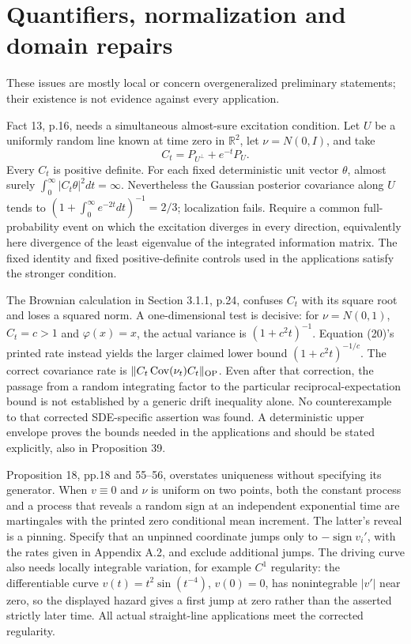 \documentclass[10pt]{article}
\begin{document}
\section*{Quantifiers, normalization and domain repairs}
These issues are mostly local or concern overgeneralized preliminary statements; their existence is not evidence against every application.\par
Fact 13, p.16, needs a simultaneous almost-sure excitation condition. Let \(U\) be a uniformly random line known at time zero in \(\mathbb R^2\), let \(\nu=N(0,I)\), and take \[C_t=P_{U^\perp}+e^{-t}P_U.\] Every \(C_t\) is positive definite. For each fixed deterministic unit vector \(\theta\), almost surely \(\int_0^\infty|C_t\theta|^2dt=\infty\). Nevertheless the Gaussian posterior covariance along \(U\) tends to \((1+\int_0^\infty e^{-2t}dt)^{-1}=2/3\); localization fails. Require a common full-probability event on which the excitation diverges in every direction, equivalently here divergence of the least eigenvalue of the integrated information matrix. The fixed identity and fixed positive-definite controls used in the applications satisfy the stronger condition.\par
The Brownian calculation in Section 3.1.1, p.24, confuses \(C_t\) with its square root and loses a squared norm. A one-dimensional test is decisive: for \(\nu=N(0,1)\), \(C_t=c>1\) and \(\varphi(x)=x\), the actual variance is \((1+c^2t)^{-1}\). Equation (20)’s printed rate instead yields the larger claimed lower bound \((1+c^2t)^{-1/c}\). The correct covariance rate is \(\|C_t\operatorname{Cov}(\nu_t)C_t\|_{\rm OP}\). Even after that correction, the passage from a random integrating factor to the particular reciprocal-expectation bound is not established by a generic drift inequality alone. No counterexample to that corrected SDE-specific assertion was found. A deterministic upper envelope proves the bounds needed in the applications and should be stated explicitly, also in Proposition 39.\par
Proposition 18, pp.18 and 55–56, overstates uniqueness without specifying its generator. When \(v\equiv0\) and \(\nu\) is uniform on two points, both the constant process and a process that reveals a random sign at an independent exponential time are martingales with the printed zero conditional mean increment. The latter’s reveal is a pinning. Specify that an unpinned coordinate jumps only to \(-\operatorname{sign}v_i'\), with the rates given in Appendix A.2, and exclude additional jumps. The driving curve also needs locally integrable variation, for example \(C^1\) regularity: the differentiable curve \(v(t)=t^2\sin(t^{-4})\), \(v(0)=0\), has nonintegrable \(|v'|\) near zero, so the displayed hazard gives a first jump at zero rather than the asserted strictly later time. All actual straight-line applications meet the corrected regularity.\par
\end{document}
